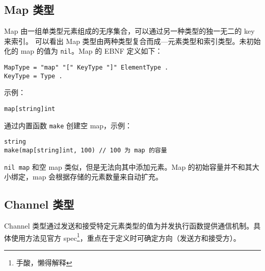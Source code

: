 \subsection{Map 类型}
Map 由一组单类型元素组成的无序集合，可以通过另一种类型的独一无二的 key 来索引。
可以看出 Map 类型由两种类型复合而成---元素类型和索引类型。未初始化的 map 的值为 \lstinline|nil|。Map 的 EBNF 定义如下：
\begin{verbatim}
MapType	= "map" "[" KeyType "]" ElementType .
KeyType	= Type .
\end{verbatim}
示例：
\begin{lstlisting}
map[string]int
\end{lstlisting}
通过内置函数 \lstinline|make| 创建空 map，示例：
\begin{lstlisting}
string
make(map[string]int, 100) // 100 为 map 的容量
\end{lstlisting}
\lstinline|nil map| 和空 map 类似，但是无法向其中添加元素。Map 的初始容量并不和其大小绑定，map 会根据存储的元素数量来自动扩充。

\subsection{Channel 类型}
Channel 类型通过发送和接受特定元素类型的值为并发执行函数提供通信机制。具体使用方法见官方 spec\footnote{手酸，懒得解释}，重点在于定义时可确定方向（发送方和接受方）。
